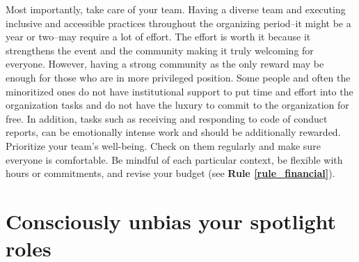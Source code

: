 \documentclass[10pt,letterpaper]{article}
\begin{document}
Most importantly, take care of your team. 
Having a diverse team and executing inclusive and accessible practices throughout the organizing period--it might be a year or two--may require a lot of effort. The effort is worth it because it strengthens the event and the community making it truly welcoming for everyone. 
However, having a strong community as the only reward may be enough for those who are in more privileged position. 
Some people and often the minoritized ones do not have institutional support to put time and effort into the organization tasks and do not have the luxury to commit to the organization for free. 
In addition, tasks such as receiving and responding to code of conduct reports, can be emotionally intense work and should be additionally rewarded.
Prioritize your team's well-being. Check on them regularly and make sure everyone is comfortable. 
Be mindful of each particular context, be flexible with hours or commitments, and revise your budget (see \textbf{Rule \ref{rule_financial}}). 


\section{Consciously unbias your spotlight roles}
\label{rule_unbias}
\end{document}

